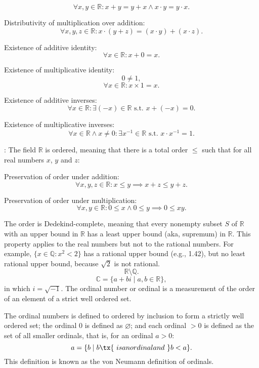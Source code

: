 \documentclass[a4paper,12pt]{article}
\begin{document}
\[\forall x,y\in\mathbb{R}\colon x+y=y+x\land x\cdot y=y\cdot x.\]
\item Distributivity of multiplication over addition:
\[\forall x,y,z\in\mathbb{R}\colon x\cdot(y+z)=(x\cdot y)+(x\cdot z).\]
\item Existence of additive identity:
\[\forall x\in\mathbb{R}\colon x+0=x.\]
\item Existence of multiplicative identity:
\[0\neq 1,\]
\[\forall x\in\mathbb{R}\colon x\times 1=x.\]
\item Existence of additive inverses:
\[\forall x\in\mathbb{R}\colon\exists(-x)\in\mathbb{R}\text{\ s.t.\ }x+(-x)=0.\]
\item Existence of multiplicative inverses:
\[\forall x\in\mathbb{R}\land x\neq 0\colon\exists x^{-1}\in\mathbb{R}\text{\ s.t.\ }x\cdot x^{-1}=1.\]
\eit
\item {}: The field $\mathbb{R}$ is ordered, meaning that there is a total order $\leq$ such that for all real numbers $x$, $y$ and $z$:
\bit
\item Preservation of order under addition:
\[\forall x,y,z\in\mathbb{R}\colon x\leq y\implies x+z\leq y+z.\]
\item Preservation of order under multiplication:
\[\forall x,y\in\mathbb{R}\colon 0\leq x\land 0\leq y\implies 0\leq xy.\]
\item The order is Dedekind-complete, meaning that every nonempty subset $S$ of $\mathbb{R}$ with an upper bound in $\mathbb{R}$ has a least upper bound (aka, supremum) in $\mathbb{R}$. This property applies to the real numbers but not to the rational numbers. For example, $\{x\in\mathbb{Q}\colon x^2<2\}$ has a rational upper bound (e.g., 1.42), but no least rational upper bound, because $\sqrt{2}$ is not rational.
\eit\eit
{}
\[\mathbb{R}\setminus\mathbb{Q}.\]
\[\mathbb{C}=\{a+bi\mid a,b\in\mathbb{R}\},\]
in which $i=\sqrt{-1}$.
The ordinal number or ordinal is a measurement of the order of an element of a strict well ordered set.

The ordinal numbers is defined to ordered by inclusion to form a strictly well ordered set; the ordinal $0$ is defined as $\varnothing$; and each ordinal $>0$ is defined as the set of all smaller ordinals, that is, for an ordinal $a>0$:
\[a=\{b\mid b\tx{\ is an ordinal and\ }b<a\}.\]
This definition is known as the von Neumann definition of ordinals.
\end{document}
